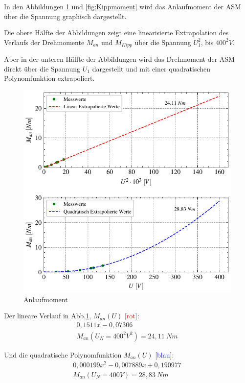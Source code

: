 \documentclass[conference]{IEEEtran}
\begin{document}
In den Abbildungen \ref{fig:Anlaufmoment} und \ref{fig:Kippmoment} wird das
Anlaufmoment der ASM über die Spannung graphisch dargestellt.

Die obere Hälfte der Abbildungen zeigt eine linearisierte Extrapolation des
Verlaufs der Drehmomente $M_{an}$ und $M_{\textit{Kipp}}$ über die Spannung
$U_1^2$, bis $400^2V$.

Aber in der unteren Hälfte der Abbildungen wird das Drehmoment der ASM direkt
über die Spannung $U_1$ dargestellt und mit einer quadratischen Polynomfunktion
extrapoliert.



\begin{figure}[htbp]
    \centering
    \includegraphics[width=\columnwidth]{./figures/anlaufmoment.pdf}
    \caption{Anlaufmoment}
    \label{fig:Anlaufmoment}
\end{figure}

Der lineare Verlauf in Abb.\ref{fig:Anlaufmoment}, $M_{an}(U)$ [\textcolor{red}{rot}]:
\begin{gather*}
    0,1511 x - 0,07306 \\
    M_{an}(U_N=400^2V^2)=24,11\ \si{Nm}
\end{gather*}

Und die quadratische Polynomfunktion $M_{an}(U)$ [\textcolor{blue}{blau}]:
\begin{gather*}
    0,000199 x^2 -0,007889 x + 0,190977\\
    M_{an}(U_N=400V)=28,83\ \si{Nm}
\end{gather*}
\end{document}
